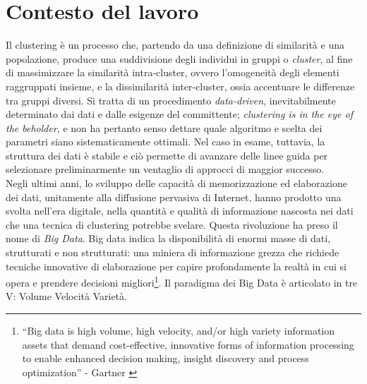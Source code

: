 \section{Contesto del lavoro}
\label{sec:contesto}
Il clustering \`e un processo che, partendo da una definizione di similarit\`a e una popolazione, produce una suddivisione degli individui in gruppi o \textit{cluster}, al fine di massimizzare la similarit\`a intra-cluster, ovvero l'omogeneit\`a degli elementi raggruppati insieme, e la dissimilarit\`a inter-cluster, ossia accentuare le differenze tra gruppi diversi. Si tratta di un procedimento \textit{data-driven}, inevitabilmente determinato dai dati e dalle esigenze del committente; \textit{clustering is in the eye of the beholder}, e non ha pertanto senso dettare quale algoritmo e scelta dei parametri siano sistematicamente ottimali. Nel caso in esame, tuttavia, la struttura dei dati \`e stabile e ci\`o permette di avanzare delle linee guida per selezionare preliminarmente un ventaglio di approcci di maggior successo.\\
Negli ultimi anni, lo sviluppo delle capacit\`a di memorizzazione ed elaborazione dei dati, unitamente alla diffusione pervasiva di Internet, hanno prodotto una svolta nell'era digitale, nella quantit\`a e qualit\`a di informazione nascosta nei dati che una tecnica di clustering potrebbe svelare. Questa rivoluzione ha preso il nome di \textit{Big Data}. Big data indica la disponibilit\`a di enormi masse di dati, strutturati e non strutturati: una miniera di informazione grezza che richiede tecniche innovative di elaborazione per capire profondamente la realt\`a in cui si opera e prendere decisioni migliori\footnote{``Big data is high volume, high velocity, and/or high variety information assets that demand cost-effective, innovative forms of information processing to enable enhanced decision making, insight discovery and process optimization'' - Gartner \cite{laney01}}.
Il paradigma dei Big Data \`e articolato in tre V: Volume Velocit\`a Variet\`a.

